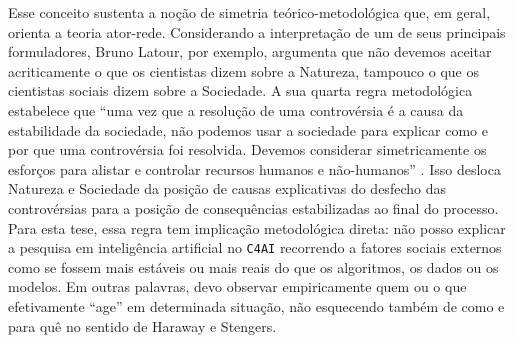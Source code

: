 Esse conceito sustenta a noção de simetria teórico-metodológica que, em geral, orienta a teoria ator-rede. Considerando a interpretação de um de seus principais formuladores, Bruno Latour, por exemplo, argumenta que não devemos aceitar acriticamente o que os cientistas dizem sobre a Natureza, tampouco o que os cientistas sociais dizem sobre a Sociedade. A sua quarta regra metodológica estabelece que ``uma vez que a resolução de uma controvérsia é a causa da estabilidade da sociedade, não podemos usar a sociedade para explicar como e por que uma controvérsia foi resolvida. Devemos considerar simetricamente os esforços para alistar e controlar recursos humanos e não-humanos'' \parencite[p. 225]{Latour2011CienciaEmAcao}. Isso desloca Natureza e Sociedade da posição de causas explicativas do desfecho das controvérsias para a posição de consequências estabilizadas ao final do processo. Para esta tese, essa regra tem implicação metodológica direta: não posso explicar a pesquisa em inteligência artificial no \texttt{C4AI} recorrendo a fatores sociais externos como se fossem mais estáveis ou mais reais do que os algoritmos, os dados ou os modelos. Em outras palavras, devo observar empiricamente quem ou o que efetivamente \enquote{age} em determinada situação, não esquecendo também de como e para quê no sentido de Haraway e Stengers. 

